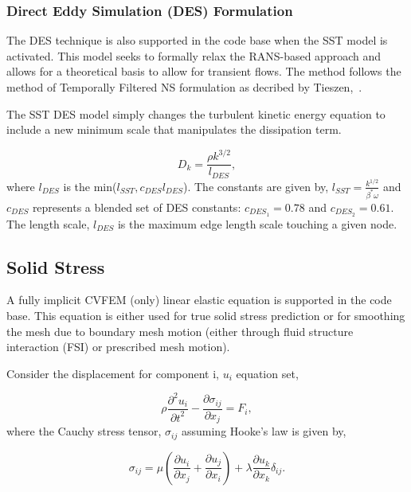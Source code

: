 \subsubsection{Direct Eddy Simulation (DES) Formulation}
The DES technique is also supported in the code base when the SST model is activated. 
This model seeks to formally relax the RANS-based approach and allows for a theoretical
basis to allow for transient flows. The method follows the method of Temporally
Filtered NS formulation as decribed by Tieszen,~\cite{Tieszen:2005}.

The SST DES model simply changes the turbulent kinetic energy equation to include
a new minimum scale that manipulates the dissipation term.

\begin{equation}
D_k = \frac{\rho k^{3/2}} {l_{DES}},
\end{equation}
where $l_{DES}$ is the min($l_{SST}, c_{DES}l_{DES}$). The constants are given by, 
$l_{SST}=\frac{k^{1/2}}{\beta^* \omega}$ and $c_{DES}$ represents a blended set of 
DES constants: $c_{{DES}_1} = 0.78$ and  $c_{{DES}_2} = 0.61$. The length scale, $l_{DES}$
is the maximum edge length scale touching a given node. 

\subsection{Solid Stress}

A fully implicit CVFEM (only) linear elastic equation is supported in the code base. 
This equation is either used for true solid stress prediction or for smoothing the
mesh due to boundary mesh motion (either through fluid structure interaction (FSI) or
prescribed mesh motion).

Consider the displacement for component i, $u_i$ equation set,

\begin{equation}
 \rho \frac{\partial^2 u_i} {{\partial t}^2} - \frac{\partial \sigma_{ij}}{\partial x_j} = F_i,
\label{linearElastic}
\end{equation}
where the Cauchy stress tensor, $\sigma_{ij}$ assuming Hooke's law is given by,

\begin{equation}
 \sigma_{ij} = \mu \left ( \frac{\partial u_i}{\partial x_j} +  \frac{\partial u_j}{\partial x_i} \right)
 + \lambda \frac{\partial u_k}{\partial x_k} \delta_{ij}.
\label{stress}
\end{equation}


